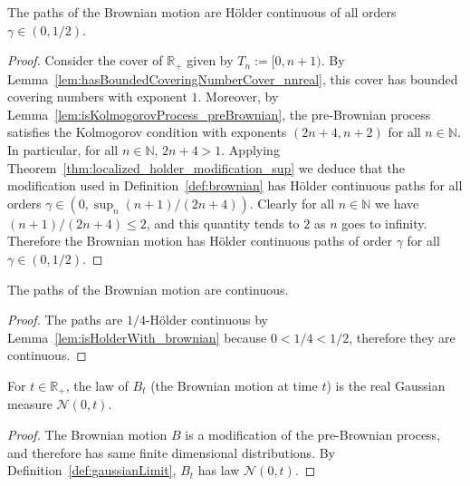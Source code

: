 \begin{lemma}\label{lem:isHolderWith_brownian}
  \leanok
The paths of the Brownian motion are Hölder continuous of all orders $\gamma \in (0, 1/2)$.
\end{lemma}

\begin{proof}\leanok
Consider the cover of $\mathbb{R}_+$ given by $T_n := [0, n + 1)$. By Lemma~\ref{lem:hasBoundedCoveringNumberCover_nnreal}, this cover has bounded covering numbers with exponent $1$. Moreover, by Lemma~\ref{lem:isKolmogorovProcess_preBrownian}, the pre-Brownian process satisfies the Kolmogorov condition with exponents $(2n + 4, n + 2)$ for all $n \in \mathbb{N}$. In particular, for all $n \in \mathbb{N}$, $2n + 4 > 1$. Applying Theorem~\ref{thm:localized_holder_modification_sup} we deduce that the modification used in Definition~\ref{def:brownian} has Hölder continuous paths for all orders $\gamma \in (0, \sup_n (n + 1) / (2n + 4))$. Clearly for all $n \in \mathbb{N}$ we have $(n + 1) / (2n + 4) \leqslant 2$, and this quantity tends to $2$ as $n$ goes to infinity. Therefore the Brownian motion has Hölder continuous paths of order $\gamma$ for all $\gamma \in (0, 1 / 2)$.
\end{proof}


\begin{lemma}\label{lem:continuous_brownian}
  \leanok
The paths of the Brownian motion are continuous.
\end{lemma}

\begin{proof}\leanok
The paths are $1/4$-Hölder continuous by Lemma~\ref{lem:isHolderWith_brownian} because $0 < 1/4 < 1/2$, therefore they are continuous.
\end{proof}


\begin{lemma}\label{lem:measurePreserving_brownian_apply}
  \leanok
For $t \in \mathbb{R}_+$, the law of $B_t$ (the Brownian motion at time $t$) is the real Gaussian measure $\mathcal{N}(0,t)$.
\end{lemma}

\begin{proof}\leanok
The Brownian motion $B$ is a modification of the pre-Brownian process, and therefore has same finite dimensional distributions. By Definition~\ref{def:gaussianLimit}, $B_t$ has law $\mathcal{N}(0,t)$.
\end{proof}


